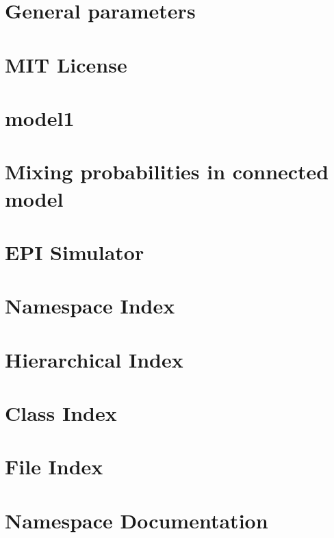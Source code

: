 \let\mypdfximage\pdfximage\def\pdfximage{\immediate\mypdfximage}\documentclass[twoside]{book}
\newcommand{\+}{\discretionary{\mbox{\scriptsize$\hookleftarrow$}}{}{}}
\begin{document}
\chapter{General parameters}
\label{md_examples_09_sir_connected_09_sir_connected}

\chapter{MIT License}
\label{md__l_i_c_e_n_s_e}

\chapter{model1}
\label{md_model1}

\chapter{Mixing probabilities in connected model}
\label{md_paper_mixing}

\chapter{EPI Simulator}
\label{md__r_e_a_d_m_e_old}

\chapter{Namespace Index}

\chapter{Hierarchical Index}

\chapter{Class Index}

\chapter{File Index}

\chapter{Namespace Documentation}

\end{document}

